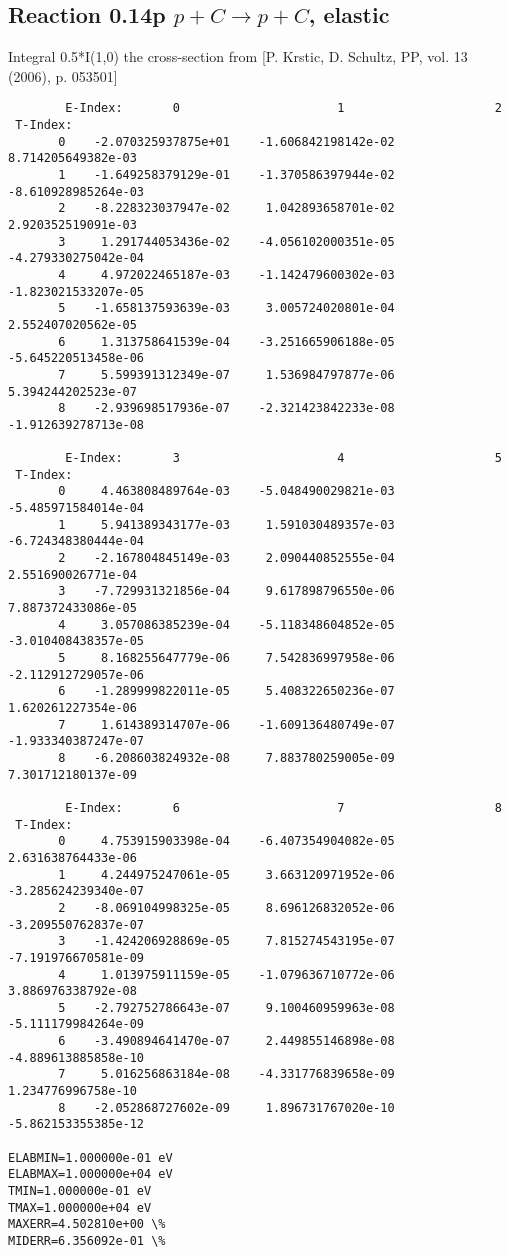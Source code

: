 \documentclass[12pt,dvipdfmx]{article}
\begin{document}
\subsection{
Reaction 0.14p  $p + C \rightarrow p + C$, elastic}

Integral 0.5*I(1,0) the cross-section from [P. Krstic, D. Schultz, PP, vol. 13 (2006), p. 053501]

\begin{small}\begin{verbatim}
        E-Index:       0                      1                     2
 T-Index:
       0    -2.070325937875e+01    -1.606842198142e-02     8.714205649382e-03
       1    -1.649258379129e-01    -1.370586397944e-02    -8.610928985264e-03
       2    -8.228323037947e-02     1.042893658701e-02     2.920352519091e-03
       3     1.291744053436e-02    -4.056102000351e-05    -4.279330275042e-04
       4     4.972022465187e-03    -1.142479600302e-03    -1.823021533207e-05
       5    -1.658137593639e-03     3.005724020801e-04     2.552407020562e-05
       6     1.313758641539e-04    -3.251665906188e-05    -5.645220513458e-06
       7     5.599391312349e-07     1.536984797877e-06     5.394244202523e-07
       8    -2.939698517936e-07    -2.321423842233e-08    -1.912639278713e-08

        E-Index:       3                      4                     5
 T-Index:
       0     4.463808489764e-03    -5.048490029821e-03    -5.485971584014e-04
       1     5.941389343177e-03     1.591030489357e-03    -6.724348380444e-04
       2    -2.167804845149e-03     2.090440852555e-04     2.551690026771e-04
       3    -7.729931321856e-04     9.617898796550e-06     7.887372433086e-05
       4     3.057086385239e-04    -5.118348604852e-05    -3.010408438357e-05
       5     8.168255647779e-06     7.542836997958e-06    -2.112912729057e-06
       6    -1.289999822011e-05     5.408322650236e-07     1.620261227354e-06
       7     1.614389314707e-06    -1.609136480749e-07    -1.933340387247e-07
       8    -6.208603824932e-08     7.883780259005e-09     7.301712180137e-09

        E-Index:       6                      7                     8
 T-Index:
       0     4.753915903398e-04    -6.407354904082e-05     2.631638764433e-06
       1     4.244975247061e-05     3.663120971952e-06    -3.285624239340e-07
       2    -8.069104998325e-05     8.696126832052e-06    -3.209550762837e-07
       3    -1.424206928869e-05     7.815274543195e-07    -7.191976670581e-09
       4     1.013975911159e-05    -1.079636710772e-06     3.886976338792e-08
       5    -2.792752786643e-07     9.100460959963e-08    -5.111179984264e-09
       6    -3.490894641470e-07     2.449855146898e-08    -4.889613885858e-10
       7     5.016256863184e-08    -4.331776839658e-09     1.234776996758e-10
       8    -2.052868727602e-09     1.896731767020e-10    -5.862153355385e-12

ELABMIN=1.000000e-01 eV
ELABMAX=1.000000e+04 eV
TMIN=1.000000e-01 eV
TMAX=1.000000e+04 eV
MAXERR=4.502810e+00 \%
MIDERR=6.356092e-01 \%
\end{verbatim}\end{small}
\newpage
\end{document}
